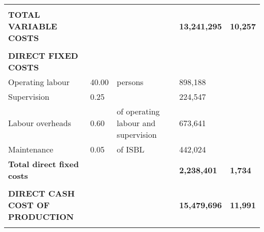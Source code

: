 \begin{table}[H]
\begin{tabular}{llllll}
\textbf{}                               & \textbf{}             & \textbf{}                             & \textbf{}                 & \textbf{}                  & \textbf{}            \\ \cline{5-6} 
\textbf{TOTAL VARIABLE COSTS}           & \textbf{}             & \textbf{}                             & \textbf{}                 & \textbf{13,241,295}        & \textbf{10,257}      \\
                                        &                       &                                       &                           & \textbf{}                  &                      \\
\textbf{DIRECT FIXED COSTS}             &                       &                                       &                           & \textbf{}                  &                      \\
Operating labour                        & 40.00                 & persons                               &                           & 898,188                    &                      \\
Supervision                             & 0.25                  &                                       &                           & 224,547                    &                      \\
Labour overheads                        & 0.60                  & of operating labour and supervision   &                           & 673,641                    &                      \\
Maintenance                             & 0.05                  & of ISBL                               &                           & 442,024                    &                      \\ \cline{5-6} 
\textbf{Total direct fixed costs}       &                       &                                       &                           & \textbf{2,238,401}         & \textbf{1,734}       \\
                                        &                       &                                       &                           & \textbf{}                  &                      \\ \cline{5-6} 
\textbf{DIRECT CASH COST OF PRODUCTION} &                       &                                       &                           & \textbf{15,479,696}        & \textbf{11,991}      \\
                                        &                       &                                       &                           & \textbf{}                  &                      \\

\end{tabular}
\end{table}

